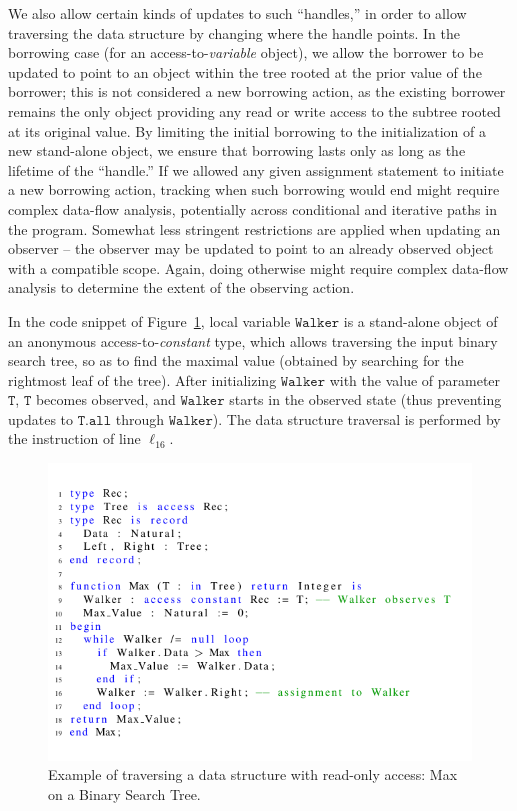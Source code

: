 \documentclass{llncs}
\newcommand\var[1]{\ensuremath{\mathtt{#1}}}
\begin{document}
We also allow certain kinds of updates to such ``handles,'' in order to allow traversing the data structure by changing where the handle points.
In the borrowing case (for an access-to-\textit{variable} object), we allow the borrower to be updated to point to an object within the tree rooted at the prior value of the borrower; this is not considered a new borrowing action, as the existing borrower remains the only object providing any read or write access to the subtree rooted at its original value.
By limiting the initial borrowing to the initialization of a new stand-alone object, we ensure that borrowing lasts only as long as the lifetime of the ``handle.''  If we allowed any given assignment statement to initiate a new borrowing action, tracking when such borrowing would end might require complex data-flow analysis, potentially across conditional and iterative paths in the program.  Somewhat less stringent restrictions are applied when updating an observer -- the observer may be updated to point to an already observed object with a compatible scope. Again, doing otherwise might require complex data-flow analysis to determine the extent of the observing action.

In the code snippet of Figure~\ref{fig:maxTree}, local variable \var{Walker} is a stand-alone object of an anonymous access-to-\textit{constant} type, which allows traversing the input binary
search tree, so as to find the maximal value (obtained by searching for the rightmost leaf of the tree). After initializing \var{Walker} with the value of parameter \var{T},
\var{T} becomes observed, and \var{Walker} starts in the observed state (thus preventing updates to \var{T.all} through \var{Walker}). The data structure traversal is performed by the instruction
of line $\ell_{16}$.

\begin{figure}[htb!]
\centering
  \captionsetup{justification=centering,margin=0.6cm}
   \includegraphics[]{maxTree}
   \caption{Example of traversing a data structure with read-only access: Max on a Binary Search Tree.}
   \label{fig:maxTree}
\end{figure}
\end{document}

